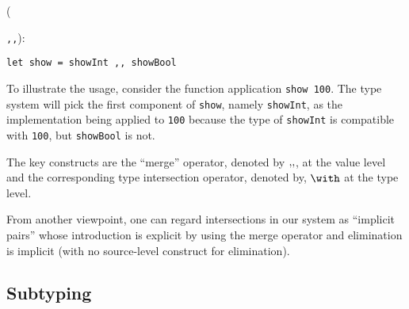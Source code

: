({\lstinline{,,}):
\begin{lstlisting}
let show = showInt ,, showBool
\end{lstlisting}

To illustrate the usage, consider the function application \lstinline{show 100}.
The type system will pick the first component of \lstinline{show}, namely
\lstinline{showInt}, as the implementation being applied to \lstinline{100}
because the type of \lstinline{showInt} is compatible with \lstinline{100}, but
\lstinline{showBool} is not.

The key constructs are the ``merge'' operator, denoted by $ ,\!, $, at the
value level and the corresponding type intersection operator, denoted by,
$ \intersects $ at the type level.

From another viewpoint, one can regard intersections in our system as ``implicit
pairs'' whose introduction is explicit by using the merge operator and
elimination is implicit (with no source-level construct for
elimination). 








\subsection{Subtyping}

}
